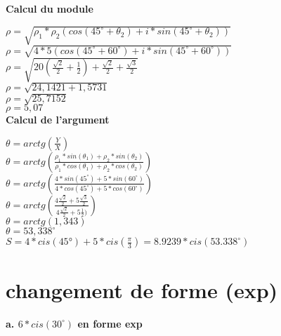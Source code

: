 \textbf{Calcul du module} \\
\vspace{3mm} %

$\rho = \sqrt{\rho_1*\rho_2 (cos(45^{\circ} + \theta_2)+ i* sin(45^{\circ}+ \theta_2)) }$ \\

$\rho = \sqrt{4*5 (cos(45^{\circ} + 60^{\circ})+ i* sin(45^{\circ}+ 60^{\circ})) }$ \\

$\rho = \sqrt{20  (\frac{\sqrt{2}}{2} + \frac{1}{2}) + \frac{\sqrt{2}} {2} + \frac{\sqrt{3}} {2} }$\\

$\rho = \sqrt{24,1421 + 1,5731 }$\\

$\rho = \sqrt{25,7152}$\\

$\rho = 5,07$\\

\textbf{Calcul de l'argument} \\
\vspace{3mm} %

$\theta = arctg(\frac{Y}{X})$\\

$\theta = arctg(\frac{\rho_1 * sin(\theta_1) + \rho_2 * sin(\theta_2)} {\rho_1 * cos(\theta_1) + \rho_2 * cos(\theta_2)})$ \\

$\theta = arctg(\frac{4 * sin(45^{\circ}) + 5 * sin(60^{\circ})} {4 * cos(45^{\circ}) + 5 * cos(60^{\circ})})$ \\

$\theta = arctg(\frac{4\frac{\sqrt{2}} {2} + 5\frac{\sqrt{3}} {2}} {4\frac{\sqrt{2}} {2} + 5\frac{1} {2})})$ \\

$\theta = arctg(1,343)$ \\

$\theta = 53,338^{\circ}$ \\

$ S = 4*cis(45°) + 5*cis(\frac{\pi}{3}) = 8.9239 * cis(53.338^{\circ})$ \\

\newpage
\section{changement de forme (exp)}
\vspace{5mm}

\textbf{a. $6*cis(30^{\circ})$ en forme exp} \\

